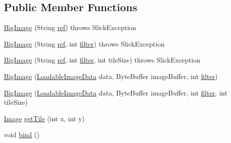 \subsection*{Public Member Functions}
\begin{DoxyCompactItemize}
\item 
\mbox{\hyperlink{classorg_1_1newdawn_1_1slick_1_1_big_image_a2c46e1840b346bbd28b3b8f9efcadf39}{Big\+Image}} (String \mbox{\hyperlink{classorg_1_1newdawn_1_1slick_1_1_image_a32694687591a80299d8b8ad1ea070cee}{ref}})  throws Slick\+Exception 
\item 
\mbox{\hyperlink{classorg_1_1newdawn_1_1slick_1_1_big_image_ad4aeff57f2ebeb47c12511d4f1fcc164}{Big\+Image}} (String \mbox{\hyperlink{classorg_1_1newdawn_1_1slick_1_1_image_a32694687591a80299d8b8ad1ea070cee}{ref}}, int \mbox{\hyperlink{classorg_1_1newdawn_1_1slick_1_1_image_a1c6f09687817420f3762f32bb1c3ed76}{filter}})  throws Slick\+Exception 
\item 
\mbox{\hyperlink{classorg_1_1newdawn_1_1slick_1_1_big_image_a0be1790789554eaa16edb744746f2f29}{Big\+Image}} (String \mbox{\hyperlink{classorg_1_1newdawn_1_1slick_1_1_image_a32694687591a80299d8b8ad1ea070cee}{ref}}, int \mbox{\hyperlink{classorg_1_1newdawn_1_1slick_1_1_image_a1c6f09687817420f3762f32bb1c3ed76}{filter}}, int tile\+Size)  throws Slick\+Exception 
\item 
\mbox{\hyperlink{classorg_1_1newdawn_1_1slick_1_1_big_image_a020e5bd78fd839b45afa304c2798a9a3}{Big\+Image}} (\mbox{\hyperlink{interfaceorg_1_1newdawn_1_1slick_1_1opengl_1_1_loadable_image_data}{Loadable\+Image\+Data}} data, Byte\+Buffer image\+Buffer, int \mbox{\hyperlink{classorg_1_1newdawn_1_1slick_1_1_image_a1c6f09687817420f3762f32bb1c3ed76}{filter}})
\item 
\mbox{\hyperlink{classorg_1_1newdawn_1_1slick_1_1_big_image_aa20c5885e52d5bbbd390b61785dba0f3}{Big\+Image}} (\mbox{\hyperlink{interfaceorg_1_1newdawn_1_1slick_1_1opengl_1_1_loadable_image_data}{Loadable\+Image\+Data}} data, Byte\+Buffer image\+Buffer, int \mbox{\hyperlink{classorg_1_1newdawn_1_1slick_1_1_image_a1c6f09687817420f3762f32bb1c3ed76}{filter}}, int tile\+Size)
\item 
\mbox{\hyperlink{classorg_1_1newdawn_1_1slick_1_1_image}{Image}} \mbox{\hyperlink{classorg_1_1newdawn_1_1slick_1_1_big_image_aacc0ddbbffa51082dd07962fb143495a}{get\+Tile}} (int x, int y)
\item 
void \mbox{\hyperlink{classorg_1_1newdawn_1_1slick_1_1_big_image_a2c530b7582968a06be59703491fc13ea}{bind}} ()
\item 

\end{DoxyCompactItemize}
